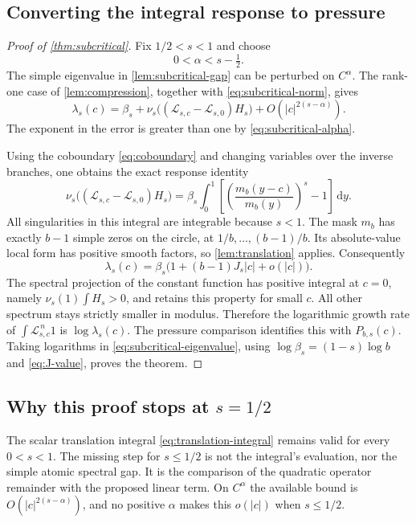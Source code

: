 \documentclass[11pt,a4paper]{article}
\numberwithin{equation}{section}
\theoremstyle{definition}
\theoremstyle{remark}
\newcommand{\dd}{\,\mathrm d}
\newcommand{\Lop}{\mathcal L}
\begin{document}
\subsection{Converting the integral response to pressure}
\begin{proof}[Proof of \cref{thm:subcritical}]
Fix $1/2<s<1$ and choose
\begin{equation}
 0<\alpha<s-\tfrac12.
 \label{eq:subcritical-alpha}
\end{equation}
The simple eigenvalue in \cref{lem:subcritical-gap} can be perturbed on
$C^\alpha$. The rank-one case of \cref{lem:compression}, together with
\cref{eq:subcritical-norm}, gives
\begin{equation}
 \lambda_s(c)=\beta_s+
 \nu_s\bigl((\Lop_{s,c}-\Lop_{s,0})H_s\bigr)
 +O(|c|^{2(s-\alpha)}).
 \label{eq:simple-response}
\end{equation}
The exponent in the error is greater than one by
\cref{eq:subcritical-alpha}.

Using the coboundary \cref{eq:coboundary} and changing variables over
the inverse branches, one obtains the exact response identity
\begin{equation}
 \nu_s\bigl((\Lop_{s,c}-\Lop_{s,0})H_s\bigr)
 =\beta_s\int_0^1
 \left[\left(\frac{m_b(y-c)}{m_b(y)}\right)^s-1\right]\dd y.
 \label{eq:response-exact}
\end{equation}
All singularities in this integral are integrable because $s<1$.
The mask $m_b$ has exactly $b-1$ simple zeros on the circle, at
$1/b,\ldots,(b-1)/b$. Its absolute-value local form has positive smooth
factors, so \cref{lem:translation} applies. Consequently
\begin{equation}
 \lambda_s(c)=\beta_s\bigl(1+(b-1)J_s|c|+o(|c|)\bigr).
 \label{eq:subcritical-eigenvalue}
\end{equation}
The spectral projection of the constant function has positive integral
at $c=0$, namely $\nu_s(1)\int H_s>0$, and retains this property for
small $c$. All other spectrum stays strictly smaller in modulus.
Therefore the logarithmic growth rate of $\int\Lop_{s,c}^{\,n}1$ is
$\log\lambda_s(c)$. The pressure comparison identifies this with
$P_{b,s}(c)$. Taking logarithms in
\cref{eq:subcritical-eigenvalue}, using
$\log\beta_s=(1-s)\log b$ and \cref{eq:J-value}, proves the theorem.
\end{proof}

\subsection{Why this proof stops at \texorpdfstring{$s=1/2$}{s = 1/2}}
The scalar translation integral \cref{eq:translation-integral} remains
valid for every $0<s<1$. The missing step for $s\le1/2$ is not the
integral's evaluation, nor the simple atomic spectral gap. It is the
comparison of the quadratic operator remainder with the proposed linear
term. On $C^\alpha$ the available bound is
$O(|c|^{2(s-\alpha)})$, and no positive $\alpha$ makes this $o(|c|)$
when $s\le1/2$.
\end{document}
